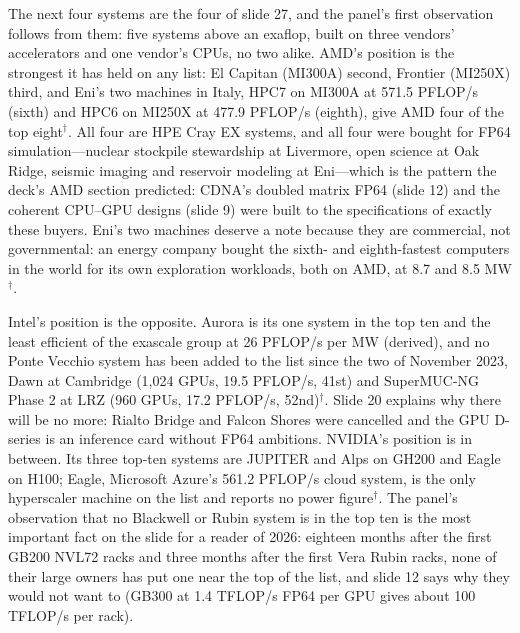 \documentclass[11pt,letterpaper]{article}
\begin{document}
The next four systems are the four of slide 27, and the panel's first observation follows from them: five systems above an exaflop, built on three vendors' accelerators and one vendor's CPUs, no two alike. AMD's position is the strongest it has held on any list: El Capitan (MI300A) second, Frontier (MI250X) third, and Eni's two machines in Italy, HPC7 on MI300A at 571.5 PFLOP/s (sixth) and HPC6 on MI250X at 477.9 PFLOP/s (eighth), give AMD four of the top eight$^\dagger$. All four are HPE Cray EX systems, and all four were bought for FP64 simulation---nuclear stockpile stewardship at Livermore, open science at Oak Ridge, seismic imaging and reservoir modeling at Eni---which is the pattern the deck's AMD section predicted: CDNA's doubled matrix FP64 (slide 12) and the coherent CPU--GPU designs (slide 9) were built to the specifications of exactly these buyers. Eni's two machines deserve a note because they are commercial, not governmental: an energy company bought the sixth- and eighth-fastest computers in the world for its own exploration workloads, both on AMD, at 8.7 and 8.5 MW$^\dagger$.

Intel's position is the opposite. Aurora is its one system in the top ten and the least efficient of the exascale group at 26 PFLOP/s per MW (derived), and no Ponte Vecchio system has been added to the list since the two of November 2023, Dawn at Cambridge (1,024 GPUs, 19.5 PFLOP/s, 41st) and SuperMUC-NG Phase 2 at LRZ (960 GPUs, 17.2 PFLOP/s, 52nd)$^\dagger$. Slide 20 explains why there will be no more: Rialto Bridge and Falcon Shores were cancelled and the GPU D-series is an inference card without FP64 ambitions. NVIDIA's position is in between. Its three top-ten systems are JUPITER and Alps on GH200 and Eagle on H100; Eagle, Microsoft Azure's 561.2 PFLOP/s cloud system, is the only hyperscaler machine on the list and reports no power figure$^\dagger$. The panel's observation that no Blackwell or Rubin system is in the top ten is the most important fact on the slide for a reader of 2026: eighteen months after the first GB200 NVL72 racks and three months after the first Vera Rubin racks, none of their large owners has put one near the top of the list, and slide 12 says why they would not want to (GB300 at 1.4 TFLOP/s FP64 per GPU gives about 100 TFLOP/s per rack).
\end{document}
